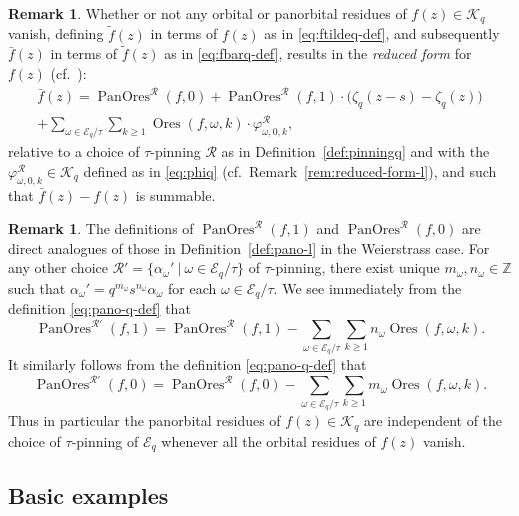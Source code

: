 \documentclass[preprint,12pt]{elsarticle}
\numberwithin{equation}{section} %
\theoremstyle{theorem}
\theoremstyle{definition}
\newtheorem{remark}[theorem]{Remark}
\newcommand{\bk}{\mathcal{K}} %
\newcommand{\bkq}{\bk_{q}} %
\newcommand{\ec}{\mathcal{E}} %
\newcommand{\ecq}{\ec_{q}}
\newcommand{\orbitq}{{\ecq/\tau}} %
\newcommand{\zq}{\zeta_{q}}
\DeclareMathOperator{\ores}{Ores}
\DeclareMathOperator{\pano}{PanOres}
\begin{document}
\begin{remark}\label{rem:reduced-form-q}
    Whether or not any orbital or panorbital residues of $f(z)\in\bkq$ vanish, defining $\tilde{f}(z)$ in terms of $f(z)$ as in \eqref{eq:ftildeq-def}, and subsequently $\bar{f}(z)$ in terms of $\tilde{f}(z)$ as in \eqref{eq:fbarq-def}, results in the \emph{reduced form} for $f(z)$ (cf.~\cite[Lem.~B.14]{Dreyfus2018}):
    \begin{multline*}\bar{f}(z)=\pano^\mathcal{R}(f,0)+\pano^\mathcal{R}(f,1)\cdot\bigl(\zq(z-s)-\zq(z)\bigr)\\+\sum_{\omega\in\orbitq}\sum_{k\geq 1}\ores(f,\omega,k)\cdot\varphi^\mathcal{R}_{\omega,0,k},\end{multline*} relative to a choice of $\tau$-pinning $\mathcal{R}$ as in Definition~\ref{def:pinningq} and with the $\varphi^\mathcal{R}_{\omega,0,k}\in\bkq$ defined as in \eqref{eq:phiq} (cf.~Remark~\ref{rem:reduced-form-l}), and such that $\bar{f}(z)-f(z)$ is summable.
\end{remark}

\begin{remark} \label{rem:pano-pinning-q} The definitions of $\pano^\mathcal{R}(f,1)$ and $\pano^\mathcal{R}(f,0)$ are direct analogues of those in Definition~\ref{def:pano-l} in the Weierstrass case. For any other choice $\mathcal{R}'=\{\alpha_\omega' \ | \ \omega\in\orbitq\}$ of $\tau$-pinning, there exist unique $m_\omega,n_\omega\in\mathbb{Z}$ such that $\alpha_\omega'=q^{m_\omega}s^{n_\omega}\alpha_\omega$ for each $\omega\in\orbitq$. We see immediately from the definition \eqref{eq:pano-q-def} that \begin{equation}\label{eq:pinning-comparison-q1} \pano^{\mathcal{R}'}(f,1)=\pano^\mathcal{R}(f,1)-\sum_{\omega\in\orbitq}\sum_{k\geq 1}n_\omega\ores(f,\omega,k).\end{equation}
   It similarly follows from the definition \eqref{eq:pano-q-def} that \begin{equation}\label{eq:pinning-comparison-q0} \pano^{\mathcal{R}'}(f,0)=\pano^\mathcal{R}(f,0)- \sum_{\omega\in\orbitq} \sum_{k\geq 1}m_\omega\ores(f,\omega,k).\end{equation}
    Thus in particular the panorbital residues of $f(z)\in\bkq$ are independent of the choice of $\tau$-pinning of $\ecq$ whenever all the orbital residues of $f(z)$ vanish.
\end{remark}

\subsection{Basic examples} \label{subsec:basic-examples-q}
\end{document}

